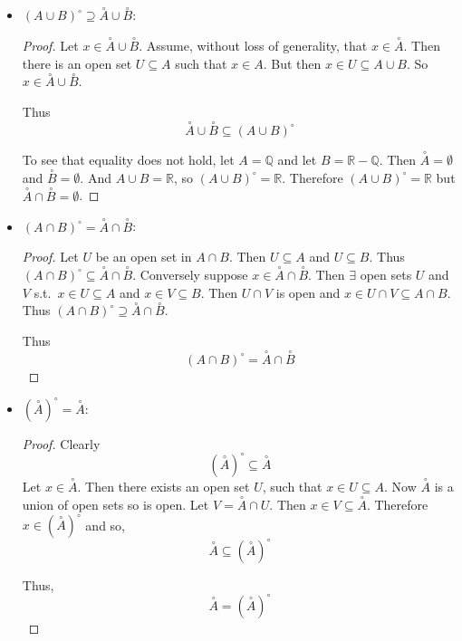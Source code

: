 \documentclass{book}
\begin{document}
\begin{enumerate}[(1)]
\begin{itemize}
            \item $(A\cup B)^{\circ}\supseteq\overset{\circ}{A}\cup\overset{\circ}{B}$:
                \begin{proof} Let $x\in\overset{\circ}{A}\cup\overset{\circ}{B}$.  Assume, without loss of generality, that $x\in\overset{\circ}{A}$. Then there is an open set $U\subseteq A$ such that $x\in A$.  But then $x\in U\subseteq A\cup B$.  So $x\in\overset{\circ}{A}\cup\overset{\circ}{B}$.  
                    \par Thus 
                    \[\overset{\circ}{A}\cup\overset{\circ}{B}\subseteq(A\cup B)^{\circ}\]
                    \par To see that equality does not hold, let $A=\mathbb Q$ and let $B=\mathbb R - \mathbb Q$.  Then $\overset{\circ}{A}=\emptyset$ and $\overset{\circ}{B}=\emptyset$.  And $A\cup B=\mathbb R$, so $(A\cup B)^{\circ}=\mathbb R$.  Therefore $(A\cup B)^\circ=\mathbb R$ but $\overset{\circ}{A}\cap \overset{\circ}{B}=\emptyset$.
                \end{proof}

            \item $(A\cap B)^{\circ}=\overset{\circ}{A}\cap\overset{\circ}{B}$:
                \begin{proof} Let $U$ be an open set in $A\cap B$.  Then $U\subseteq A$ and $U\subseteq B$.  Thus $(A\cap B)^\circ \subseteq \overset{\circ}{A}\cap\overset{\circ}{B}$.  Conversely suppose $x\in\overset{\circ}{A}\cap\overset{\circ}{B}$.  Then $\exists$ open sets $U$ and $V$ s.t.\ $x\in U\subseteq A$ and $x\in V\subseteq B$.  Then $U\cap V$ is open and $x\in U\cap V\subseteq A\cap B$.  Thus $(A\cap B)^\circ \supseteq \overset{\circ}{A}\cap\overset{\circ}{B}$.  
                    \par Thus 
                    \[(A\cap B)^\circ = \overset{\circ}{A}\cap\overset{\circ}{B}\]
                \end{proof}

            \item $(\overset{\circ}{A})^\circ=\overset{\circ}{A}$:
                \begin{proof} Clearly 
                    \[(\overset{\circ}{A})^\circ\subseteq\overset{\circ}{A}\] 
                    Let $x\in\overset{\circ}{A}$.  Then there exists an open set $U$, such that $x\in U\subseteq A$.  Now $\overset{\circ}{A}$ is a union of open sets so is open.  Let $V=\overset{\circ}{A}\cap U$.  Then $x\in V\subseteq \overset{\circ}{A}$.  Therefore $x\in(\overset{\circ}{A})^\circ$ and so, \[\overset{\circ}{A}\subseteq(\overset{\circ}{A})^\circ\]
                    \par Thus, 
                    \[\overset{\circ}{A}=(\overset{\circ}{A})^\circ\]
                \end{proof}


\end{itemize}
\end{enumerate}
\end{document}
